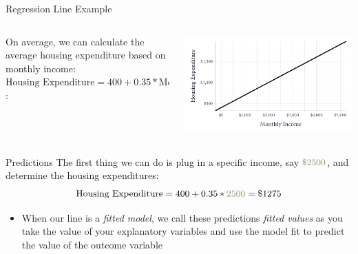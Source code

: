 \documentclass[aspectratio=169,t,11pt,table]{beamer}
\begin{document}
\begin{frame}{Regression Line Example}
  \begin{columns}[T]
    \begin{column}{.35\textwidth}
      On average, we can calculate the average housing expenditure based on monthly income: $\text{Housing Expenditure} = 400 + 0.35 * \text{Monthly Income}$: 
    \end{column}
    \begin{column}{.65\textwidth}\vspace*{-\bigskipamount}
      \begin{center}
        \includegraphics[width = \textwidth]{figures/line_housing.pdf}
      \end{center}
    \end{column}
  \end{columns}
\end{frame}

\begin{frame}{Predictions}
  The first thing we can do is plug in a specific income, say $\kelly{\$2500}$, and determine the housing expenditures:
  $$
    \text{Housing Expenditure} = 400 + 0.35 * \kelly{2500} = \$1275
  $$

  \begin{itemize}
    \item When our line is a \emph{fitted model}, we call these predictions \emph{fitted values} as you take the value of your explanatory variables and use the model fit to predict the value of the outcome variable
  \end{itemize}
\end{frame}
\end{document}
